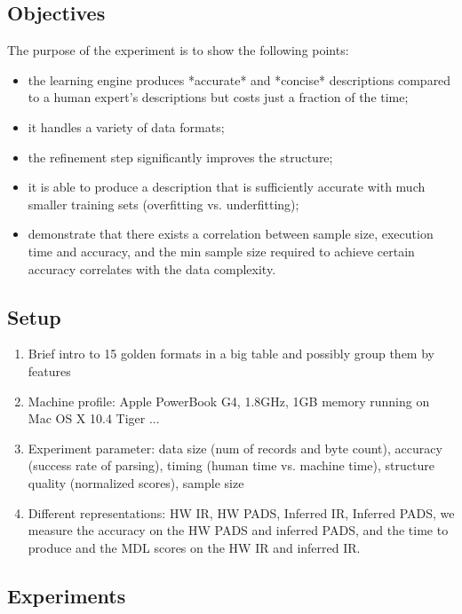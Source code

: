 \subsection{Objectives}

The purpose of the experiment is to show the following points:
\begin{itemize}
\item the learning engine produces *accurate* and *concise* descriptions compared to a human
expert's descriptions but costs just a fraction of the time; 
\item it handles a variety of data formats; 
\item the refinement step significantly improves the structure; 
\item it is able to produce a description that is sufficiently accurate with 
much smaller training sets (overfitting vs. underfitting); 
\item demonstrate that there exists a correlation between sample size, execution time and accuracy,
and the min sample size required to achieve certain accuracy correlates with the 
data complexity.
\end{itemize}

\subsection{Setup}

\begin{enumerate}
\item Brief intro to 15 golden formats in a big table and possibly group them by
features

\item Machine profile: Apple PowerBook G4, 1.8GHz, 1GB memory running on Mac OS X 10.4 Tiger ...

\item Experiment parameter: data size (num of records and byte count), accuracy (success rate of parsing), 
timing (human time vs. machine time), structure quality (normalized scores), sample size

\item Different representations: HW IR, HW PADS, Inferred IR, Inferred PADS, we measure
the accuracy on the HW PADS and inferred PADS, and the time to produce and the MDL scores on
the HW IR and inferred IR.
\end{enumerate}

\subsection{Experiments}

